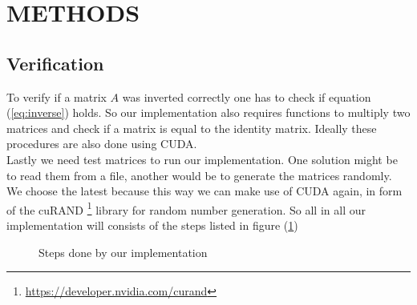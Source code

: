 

\section{METHODS}
\label{sec:methods}
\subsection*{Verification}
To verify if a matrix $A$ was inverted correctly one has to check if equation (\ref{eq:inverse}) holds. So our implementation also requires functions to multiply two matrices and check if a matrix is equal to the identity matrix. Ideally these procedures are also done using CUDA.\\
Lastly we need test matrices to run our implementation. One solution might be to read them from a file, another would be to generate the matrices randomly. We choose the latest because this way we can make use of CUDA again, in form of the cuRAND \footnote{\url{https://developer.nvidia.com/curand}} library for random number generation. So all in all our implementation will consists of the steps listed in figure (\ref{fig:steps})

\begin{figure}
\centering
\label{fig:steps}
\caption{Steps done by our implementation}
\end{figure}
